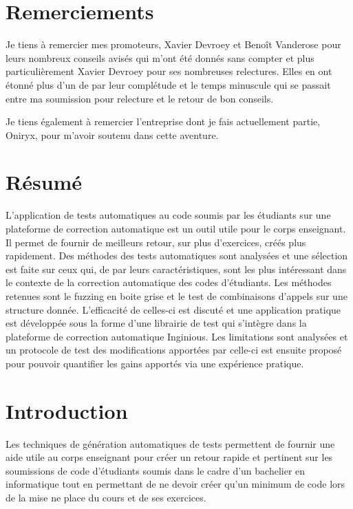 \documentclass[a4paper]{report}
\begin{document}
\nocite{*}
\chapter*{Remerciements}

Je tiens à remercier mes promoteurs, Xavier Devroey et Benoît Vanderose pour leurs nombreux conseils avisés qui m'ont été donnés sans compter et plus particulièrement Xavier Devroey pour ses nombreuses relectures.
Elles en ont étonné plus d'un de par leur complétude et le temps minuscule qui se passait entre ma soumission pour relecture et le retour de bon conseils.

Je tiens également à remercier l'entreprise dont je fais actuellement partie, Oniryx, pour m'avoir soutenu dans cette aventure.


\chapter*{Résumé}

L'application de tests automatiques au code soumis par les étudiants sur une plateforme de correction automatique est un outil utile pour le corps enseignant.
Il permet de fournir de meilleurs retour, sur plus d'exercices, créés plus rapidement.
Des méthodes des tests automatiques sont analysées et une sélection est faite sur ceux qui, de par leurs caractéristiques, sont les plus intéressant dans le contexte de la correction automatique des codes d'étudiants.
Les méthodes retenues sont le fuzzing en boite grise et le test de combinaisons d'appels sur une structure donnée.
L'efficacité de celles-ci est discuté et une application pratique est développée sous la forme d'une librairie de test qui s'intègre dans la plateforme de correction automatique Inginious.
Les limitations sont analysées et un protocole de test des modifications apportées par celle-ci est ensuite proposé pour pouvoir quantifier les gains apportés via une expérience pratique.



\tableofcontents

\chapter{Introduction}

Les techniques de génération automatiques de tests permettent de fournir une aide utile au corps enseignant pour créer un retour rapide et pertinent sur les soumissions de code d'étudiants soumis dans le cadre d'un bachelier en informatique tout en permettant de ne devoir créer qu'un minimum de code lors de la mise ne place du cours et de ses exercices.
\end{document}

